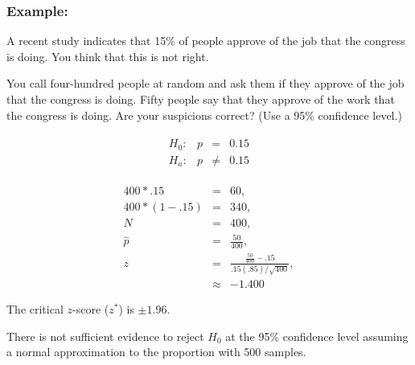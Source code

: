 \begin{frame}
  \frametitle{Example: }

  \vspace*{-2em}
  A recent study indicates that 15\% of people approve of the job that
  the congress is doing. You think that this is not right. 

  You call four-hundred people at random and ask them if they approve
  of the job that the congress is doing. Fifty people say that they
  approve of the work that the congress is doing. Are your suspicions
  correct?  (Use a 95\% confidence level.)

  {
    \begin{eqnarray*}
      \begin{array}{lrcl}
        H_0: & p & = & 0.15 \\
        H_a: & p & \neq & 0.15
      \end{array}
    \end{eqnarray*}
  }

  {
    \begin{eqnarray*}
      400*.15     & = & 60, \\
      400*(1-.15) & = & 340, \\
      N & = & 400, \\
      \hat{p} & = & \frac{50}{400}, \\
      z & = & \frac{\frac{50}{400}-.15}{.15(.85)/\sqrt{400}}, \\
      & \approx & -1.400
    \end{eqnarray*}
  }
  

  {
    The critical $z$-score ($z^*$) is $\pm 1.96$.
  }

  {

    {\color{red} 

      There is not sufficient evidence to reject $H_0$ at the 95\%
      confidence level assuming a normal approximation to the
      proportion with 500 samples.  

    }

  }


  
\end{frame}





